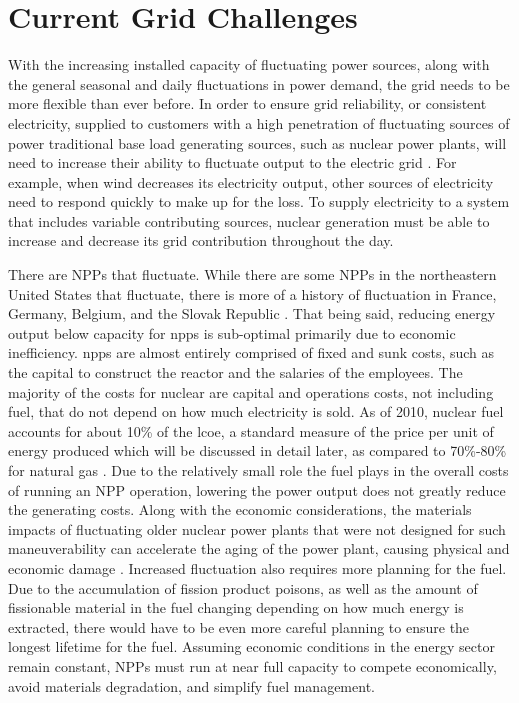 \section{Current Grid Challenges}
With the increasing installed capacity of fluctuating power sources, along with the general seasonal and daily fluctuations in power demand, the grid needs to be more flexible than ever before. In order to ensure grid reliability, or consistent electricity, supplied to customers with a high penetration of fluctuating sources of power traditional base load generating sources, such as nuclear power plants, will need to increase their ability to fluctuate output to the electric grid \cite {Denholm2011}. For example, when wind decreases its electricity output, other sources of electricity need to respond quickly to make up for the loss. To supply electricity to a system that includes variable contributing sources, nuclear generation must be able to increase and decrease its grid contribution throughout the day.

There are NPPs that fluctuate.  While there are some NPPs in the northeastern United States that fluctuate, there is more of a history of fluctuation in France, Germany, Belgium, and the Slovak Republic \cite{Jenkins2018}. That being said, reducing energy output below capacity for \ac{npps} is sub-optimal primarily due to economic inefficiency\cite{Nuclear2011}. \ac{npps} are almost entirely comprised of fixed and sunk costs, such as the capital to construct the reactor and the salaries of the employees. The majority of the costs for nuclear are capital and operations costs, not including fuel, that do not depend on how much electricity is sold. As of 2010, nuclear fuel accounts for about 10\% of the \ac{lcoe}, a standard measure of the price per unit of energy produced which will be discussed in detail later, as compared to 70\%-80\% for natural gas \cite{IEA/NEA}. Due to the relatively small role the fuel plays in the overall costs of running an NPP operation, lowering the power output does not greatly reduce the generating costs. Along with the economic considerations, the materials impacts  of fluctuating older nuclear power plants that were not designed for such maneuverability can accelerate the aging of the power plant, causing physical and economic damage \cite{Nuclear2011}. Increased fluctuation also requires more planning for the fuel.  Due to the accumulation of fission product poisons, as well as the amount of fissionable material in the fuel changing depending on how much energy is extracted, there would have to be even more careful planning to ensure the longest lifetime for the fuel. Assuming economic conditions in the energy sector remain constant, NPPs must run at near full capacity to compete economically, avoid materials degradation, and simplify fuel management.



